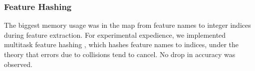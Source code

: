 \documentclass[11pt]{article}
\newcommand{\bocomment}[1]{\textcolor{Bittersweet}{[#1 -BTO]}}
\newcommand{\sam}[1]{\textcolor{blue}{[#1 -SMT]}}
\renewcommand{\bocomment}[1]{}
\renewcommand{\sam}[1]{}
\newcommand{\codenote}[1]{}
\begin{document}
\subsubsection{Feature Hashing}

  The biggest memory usage was in the map from
  feature names to integer indices during feature extraction.
  For experimental expedience, we
  implemented multitask feature hashing
  \citep{weinberger_feature_2009}, which hashes feature names to indices, under
  the theory that errors due to collisions tend to cancel.  No
  drop in accuracy was observed.


\end{document}
